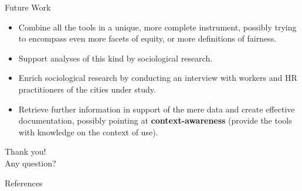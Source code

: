 \documentclass[usenames,dvipsnames]{beamer}
\begin{document}
    
    \begin{frame}{Future Work}
        \begin{itemize}
            \item Combine all the tools in a unique, more complete instrument, possibly trying to encompass even more facets of equity, or more definitions of fairness.
            \item Support analyses of this kind by sociological research.
            \item Enrich sociological research by conducting an interview with workers and HR practitioners of the cities under study.
            \item Retrieve further information in support of the mere data and create effective documentation, possibly pointing at \textbf{context-awareness} (provide the tools with knowledge on the context of use).
        \end{itemize}
    \end{frame}
    
    
    \begin{frame}
        \centering \huge Thank you!\\
        \vspace{\baselineskip}
        \centering \Large Any question?
    \end{frame}
    
    
    \begin{frame}[allowframebreaks]{References}
        \printbibliography
    \end{frame}
\end{document}
